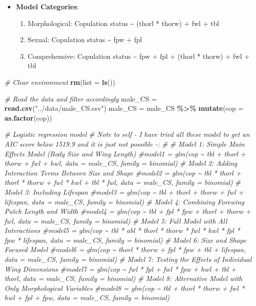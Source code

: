 \documentclass[
]{article}
\newenvironment{Shaded}{\begin{snugshade}}{\end{snugshade}}
\newcommand{\AttributeTok}[1]{\textcolor[rgb]{0.13,0.29,0.53}{#1}}
\newcommand{\CommentTok}[1]{\textcolor[rgb]{0.56,0.35,0.01}{\textit{#1}}}
\newcommand{\FunctionTok}[1]{\textcolor[rgb]{0.13,0.29,0.53}{\textbf{#1}}}
\newcommand{\NormalTok}[1]{#1}
\newcommand{\OtherTok}[1]{\textcolor[rgb]{0.56,0.35,0.01}{#1}}
\newcommand{\SpecialCharTok}[1]{\textcolor[rgb]{0.81,0.36,0.00}{\textbf{#1}}}
\newcommand{\StringTok}[1]{\textcolor[rgb]{0.31,0.60,0.02}{#1}}
\providecommand{\tightlist}{%
  \setlength{\itemsep}{0pt}\setlength{\parskip}{0pt}}
\begin{document}
\begin{itemize}
\tightlist
\item
  \textbf{Model Categories}:

  \begin{enumerate}
  \def\labelenumi{\arabic{enumi}.}
  \tightlist
  \item
    Morphological: Copulation status \textasciitilde{} (thorl * thorw) +
    fwl + tbl
  \item
    Sexual: Copulation status \textasciitilde{} fpw + fpl
  \item
    Comprehensive: Copulation status \textasciitilde{} fpw + fpl +
    (thorl * thorw) + fwl + tbl
  \end{enumerate}
\end{itemize}

\begin{Shaded}
\begin{Highlighting}[]
\CommentTok{\# Clear environment}
\FunctionTok{rm}\NormalTok{(}\AttributeTok{list =} \FunctionTok{ls}\NormalTok{())}

\CommentTok{\# Read the data and filter accordingly}
\NormalTok{male\_CS }\OtherTok{=} \FunctionTok{read.csv}\NormalTok{(}\StringTok{"../data/male\_CS.csv"}\NormalTok{)}
\NormalTok{male\_CS }\OtherTok{=}\NormalTok{ male\_CS }\SpecialCharTok{\%\textgreater{}\%} 
  \FunctionTok{mutate}\NormalTok{(}\AttributeTok{cop =} \FunctionTok{as.factor}\NormalTok{(cop))}

\CommentTok{\# Logistic regression model}
\CommentTok{\# Note to self {-} I have tried all these model to get an AIC score below 1519.9 and it is just not possible {-}:}
\CommentTok{\# \# Model 1: Simple Main Effects Model (Body Size and Wing Length)}
\CommentTok{\#model1 = glm(cop \textasciitilde{} tbl + thorl + thorw + fwl + hwl, data = male\_CS, family = binomial)}
\CommentTok{\# Model 2: Adding Interaction Terms Between Size and Shape}
\CommentTok{\#model2 = glm(cop \textasciitilde{} tbl * thorl + thorl * thorw + fwl * hwl + tbl * fwl, data = male\_CS, family = binomial)}
\CommentTok{\# Model 3: Including Lifespan}
\CommentTok{\#model3 = glm(cop \textasciitilde{} tbl + thorl + thorw + fwl + lifespan, data = male\_CS, family = binomial)}
\CommentTok{\# Model 4: Combining Forewing Patch Length and Width}
\CommentTok{\#model4 = glm(cop \textasciitilde{} tbl + fpl * fpw + thorl + thorw + fwl, data = male\_CS, family = binomial)}
\CommentTok{\# Model 5: Full Model with All Interactions}
\CommentTok{\#model5 = glm(cop \textasciitilde{} tbl * abl * thorl * thorw * fwl * hwl * fpl * fpw * lifespan, data = male\_CS, family = binomial)}
\CommentTok{\# Model 6: Size and Shape Focused Model}
\CommentTok{\#model6 = glm(cop \textasciitilde{} thorl * thorw + fpl * fpw + tbl + lifespan, data = male\_CS, family = binomial)}
\CommentTok{\# Model 7: Testing the Effects of Individual Wing Dimensions}
\CommentTok{\#model7 = glm(cop \textasciitilde{} fwl * fpl + fwl * fpw + hwl + tbl + thorl, data = male\_CS, family = binomial)}
\CommentTok{\# Model 8: Alternative Model with Only Morphological Variables}
\CommentTok{\#model8 = glm(cop \textasciitilde{} tbl + thorl * thorw + fwl * hwl + fpl + fpw, data = male\_CS, family = binomial)}


\end{Highlighting}
\end{Shaded}
\end{document}
